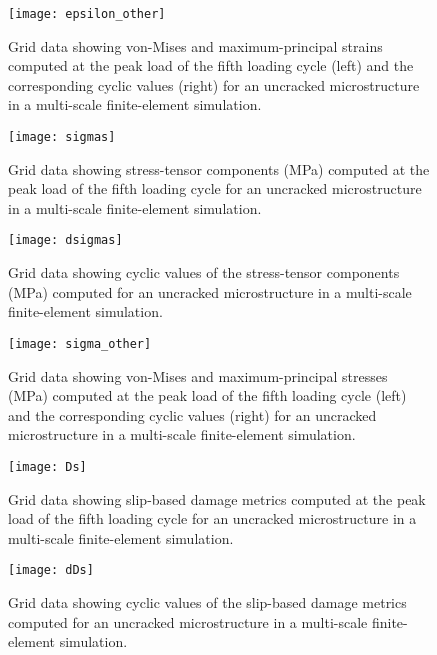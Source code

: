 \begin{figure}[p]
  \centering
    \texttt{[image: epsilon\_other]}
    \caption{Grid data showing von-Mises and maximum-principal strains computed at the peak load of the fifth loading cycle (left) and the corresponding cyclic values (right) for an uncracked microstructure in a multi-scale finite-element simulation.}
    \label{fig:epsilon_other}
\end{figure}

\begin{figure}[p]
  \centering
    \texttt{[image: sigmas]}
    \caption{Grid data showing stress-tensor components (MPa) computed at the peak load of the fifth loading cycle for an uncracked microstructure in a multi-scale finite-element simulation.}
    \label{fig:sigmas}
\end{figure}

\begin{figure}[p]
  \centering
    \texttt{[image: dsigmas]}
    \caption{Grid data showing cyclic values of the stress-tensor components (MPa) computed for an uncracked microstructure in a multi-scale finite-element simulation.}
    \label{fig:dsigmas}
\end{figure}

\begin{figure}[p]
  \centering
    \texttt{[image: sigma\_other]}
    \caption{Grid data showing von-Mises and maximum-principal stresses (MPa) computed at the peak load of the fifth loading cycle (left) and the corresponding cyclic values (right) for an uncracked microstructure in a multi-scale finite-element simulation.}
    \label{fig:sigma_other}
\end{figure}

\begin{figure}[p]
  \centering
    \texttt{[image: Ds]}
    \caption{Grid data showing slip-based damage metrics computed at the peak load of the fifth loading cycle for an uncracked microstructure in a multi-scale finite-element simulation.}
    \label{fig:Ds}
\end{figure}

\begin{figure}[p]
  \centering
    \texttt{[image: dDs]}
    \caption{Grid data showing cyclic values of the slip-based damage metrics computed for an uncracked microstructure in a multi-scale finite-element simulation.}
    \label{fig:dDs}
\end{figure}

